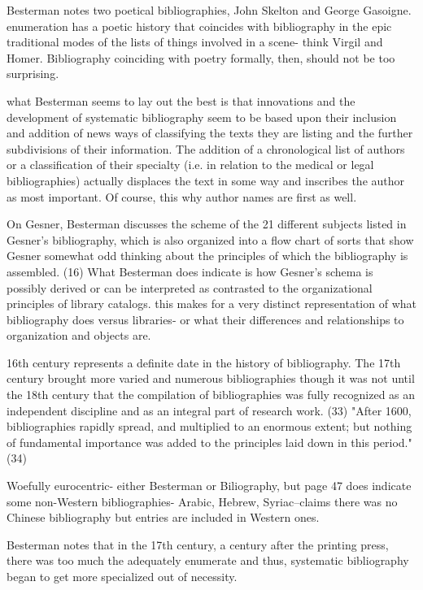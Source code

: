 \documentclass[course, english]{Notes}
\newcommand{\n}{\scalebox{2}{\textbf{\framebox{$\aleph$} } } }
\begin{document}
\begin{outline}
\1 Besterman notes two poetical bibliographies, John Skelton and George Gasoigne. 
	\2 \n enumeration has a poetic history that coincides with bibliography in the epic traditional modes of the lists of things involved in a scene- think Virgil and Homer. Bibliography coinciding with poetry formally, then, should not be too surprising. 
	
\1 \n what Besterman seems to lay out the best is that innovations and the development of systematic bibliography seem to be based upon their inclusion and addition of news ways of classifying the texts they are listing and the further subdivisions of their information. The addition of a chronological list of authors or a classification of their specialty (i.e. in relation to the medical or legal bibliographies) actually displaces the text in some way and inscribes the author as most important. Of course, this why author names are first as well. 

\1 On Gesner, Besterman discusses the scheme of the 21 different subjects listed in Gesner's bibliography, which is also organized into a flow chart of sorts that show Gesner somewhat odd thinking about the principles of which the bibliography is assembled. (16)
	\2 What Besterman does indicate is how Gesner's schema is possibly derived or can be interpreted as contrasted to the organizational principles of library catalogs.
		\3 \n this makes for a very distinct representation of what bibliography does versus libraries- or what their differences and relationships to organization and objects are. 
		
\1 16th century represents a definite date in the history of bibliography. The 17th century brought more varied and numerous bibliographies though it was not until the 18th century that the compilation of bibliographies was fully recognized as an independent discipline and as an integral part of research work. (33)
	\2 "After 1600, bibliographies rapidly spread, and multiplied to an enormous extent; but nothing of fundamental importance was added to the principles laid down in this period." (34)
	
\1 \n Woefully eurocentric- either Besterman or Biliography, but page 47 does indicate some non-Western bibliographies- Arabic, Hebrew, Syriac--claims there was no Chinese bibliography but entries are included in Western ones. 

\1 Besterman notes that in the 17th century, a century after the printing press, there was too much the adequately enumerate and thus, systematic bibliography began to get more specialized out of necessity.


\end{outline}
\end{document}
